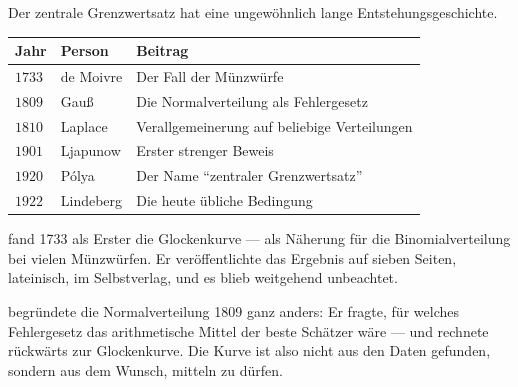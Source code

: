 \begin{geschichte}
Der zentrale Grenzwertsatz hat eine ungewöhnlich lange Entstehungsgeschichte.

\begin{center}
{\small
\renewcommand{\arraystretch}{1.42}
\begin{tabular}{@{}P{1.6cm}P{2.2cm}P{4.0cm}@{}}
\toprule
\textbf{Jahr} & \textbf{Person} & \textbf{Beitrag}\\
\midrule
$1733$ & de Moivre & Der Fall der Münzwürfe\\
$1809$ & Gauß & Die Normalverteilung als Fehlergesetz\\
$1810$ & Laplace & Verallgemeinerung auf beliebige Verteilungen\\
$1901$ & Ljapunow & Erster strenger Beweis\\
$1920$ & Pólya & Der Name \enquote{zentraler Grenzwertsatz}\\
$1922$ & Lindeberg & Die heute übliche Bedingung\\
\bottomrule
\end{tabular}}
\end{center}

 fand 1733 als Erster die Glockenkurve --- als Näherung für die Binomialverteilung bei vielen Münzwürfen. Er veröffentlichte das Ergebnis auf sieben Seiten, lateinisch, im Selbstverlag, und es blieb weitgehend unbeachtet.

\begin{center}
\begin{minipage}{0.9\textwidth}
\end{minipage}
\end{center}

 begründete die Normalverteilung 1809 ganz anders: Er fragte, für welches Fehlergesetz das arithmetische Mittel der beste Schätzer wäre --- und rechnete rückwärts zur Glockenkurve. Die Kurve ist also nicht aus den Daten gefunden, sondern aus dem Wunsch, mitteln zu dürfen.
\end{geschichte}

